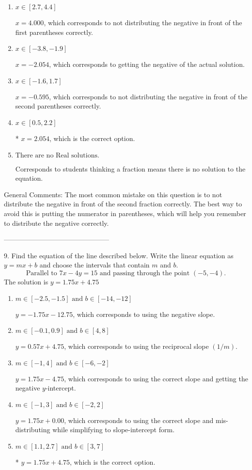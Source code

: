 \documentclass{article}[14pt]
\begin{document}
\begin{enumerate}[label=\Alph*.] 
\item $ x \in [2.7, 4.4] $ 

  $x = 4.000$, which corresponds to not distributing the negative in front of the first parentheses correctly. 
\item $ x \in [-3.8, -1.9] $ 

  $x = -2.054$, which corresponds to getting the negative of the actual solution. 
\item $ x \in [-1.6, 1.7] $ 

  $x = -0.595$, which corresponds to not distributing the negative in front of the second parentheses correctly. 
\item $ x \in [0.5, 2.2] $ 

 * $x = 2.054$, which is the correct option. 
\item $ \text{There are no Real solutions. } $ 

 Corresponds to students thinking a fraction means there is no solution to the equation. 
\end{enumerate} 
 
General Comments: The most common mistake on this question is to not distribute the negative in front of the second fraction correctly. The best way to avoid this is putting the numerator in parentheses, which will help you remember to distribute the negative correctly.

-----------------------------------------------

9. Find the equation of the line described below. Write the linear equation as $ y=mx+b $ and choose the intervals that contain $m$ and $b$.
$$ \text{Parallel to } 7 x - 4 y = 15 \text{ and passing through the point } (-5, -4). $$ 
The solution is $ y = 1.75x + 4.75 $ 

\begin{enumerate}[label=\Alph*.] 
\item $ m \in [-2.5, -1.5] \text{ and } b \in [-14, -12] $ 

  $y = -1.75x - 12.75$, which corresponds to using the negative slope. 
\item $ m \in [-0.1, 0.9] \text{ and } b \in [4, 8] $ 

  $y = 0.57x + 4.75$, which corresponds to using the reciprocal slope $(1/m)$. 
\item $ m \in [-1, 4] \text{ and } b \in [-6, -2] $ 

  $y = 1.75x - 4.75$, which corresponds to using the correct slope and getting the negative $y$-intercept. 
\item $ m \in [-1, 3] \text{ and } b \in [-2, 2] $ 

  $y = 1.75x + 0.00$, which corresponds to using the correct slope and mis-distributing while simplifying to slope-intercept form. 
\item $ m \in [1.1, 2.7] \text{ and } b \in [3, 7] $ 

 * $y = 1.75x + 4.75$, which is the correct option. 
\end{enumerate} 
 
\end{document}
